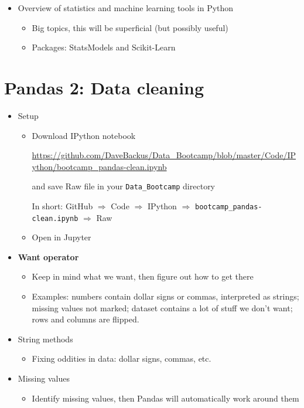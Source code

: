 \documentclass[11pt]{article}
\begin{document}
\begin{itemize}
\item Overview of statistics and machine learning tools in Python
\begin{itemize}
\item Big topics, this will be superficial (but possibly useful)
\item Packages:  StatsModels and Scikit-Learn
\end{itemize}

\end{itemize}

\section*{Pandas 2:  Data cleaning}

\begin{itemize}
\item Setup
\begin{itemize}
\item Download IPython notebook

\url{https://github.com/DaveBackus/Data_Bootcamp/blob/master/Code/IPython/bootcamp_pandas-clean.ipynb}

and save Raw file in your \verb|Data_Bootcamp| directory

In short:  GitHub $\Rightarrow$ Code $\Rightarrow$ IPython $\Rightarrow$
 \verb|bootcamp_pandas-clean.ipynb| $\Rightarrow$ Raw

\item Open in Jupyter
\end{itemize}

\item {\bf Want operator}
\begin{itemize}
\item Keep in mind what we want, then figure out how to get there
\item Examples:  numbers contain dollar signs or commas, interpreted as strings;
missing values not marked;
dataset contains a lot of stuff we don't want; rows and columns are flipped.
\end{itemize}

\item String methods
\begin{itemize}
\item Fixing oddities in data:  dollar signs, commas, etc.
\end{itemize}

\item Missing values
\begin{itemize}
\item Identify missing values, then Pandas will automatically work around them
\end{itemize}


\end{itemize}
\end{document}
